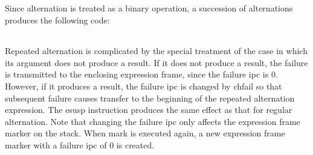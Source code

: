 Since alternation is treated as a binary operation, a succession of
alternations produces the following code:

\begin{center}
\tablelasttail{\hline}
\begin{supertabular}{|m{1.9073598in}|m{2.75596in}|}

\end{supertabular}
\end{center}

Repeated alternation is complicated by the special treatment of the
case in which its argument does not produce a result. If it does not
produce a result, the failure is transmitted to the enclosing
expression frame, since the failure ipc is 0. However, if it produces
a result, the failure ipc is changed by chfail so that subsequent
failure causes transfer to the beginning of the repeated alternation
expression. The esusp instruction produces the same effect as that for
regular alternation. Note that changing the failure ipc only affects
the expression frame marker on the stack. When mark is executed again,
a new expression frame marker with a failure ipc of 0 is created.


